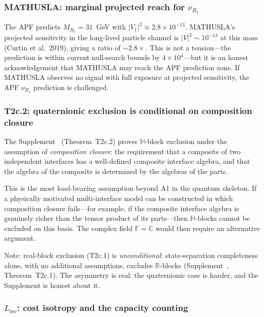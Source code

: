 \documentclass[11pt]{article}
\begin{document}
\subsubsection{MATHUSLA: marginal projected reach for \texorpdfstring{$\nu_{R_1}$}{nu\_R1}}

The APF predicts $M_{R_1} = 31$~GeV with $|V_1|^2 \approx 2.8\times10^{-13}$.  MATHUSLA's projected sensitivity in the long-lived particle channel is $|V|^2 \sim 10^{-13}$ at this mass (Curtin et al.\ 2019), giving a ratio of $\sim 2.8\times$.  This is not a tension---the prediction is within current null-search bounds by $4\times10^4$---but it is an honest acknowledgement that MATHUSLA may reach the APF prediction zone.  If MATHUSLA observes no signal with full exposure at projected sensitivity, the APF $\nu_{R_1}$ prediction is challenged.


\subsubsection{T2c.2: quaternionic exclusion is conditional on composition closure}

The Supplement~\cite{Supp} (Theorem~T2c.2) proves $\mathbb{H}$-block exclusion under the assumption of \emph{composition closure}: the requirement that a composite of two independent interfaces has a well-defined composite interface algebra, and that the algebra of the composite is determined by the algebras of the parts.

This is the most load-bearing assumption beyond A1 in the quantum skeleton.  If a physically motivated multi-interface model can be constructed in which composition closure fails---for example, if the composite interface algebra is genuinely richer than the tensor product of its parts---then $\mathbb{H}$-blocks cannot be excluded on this basis.  The complex field $\mathbb{F} = \mathbb{C}$ would then require an alternative argument.

Note: real-block exclusion (T2c.1) is \emph{unconditional}: state-separation completeness alone, with no additional assumptions, excludes $\mathbb{R}$-blocks (Supplement~\cite{Supp}, Theorem~T2c.1).  The asymmetry is real: the quaternionic case is harder, and the Supplement is honest about it.

\subsubsection{\texorpdfstring{$L_{\mathrm{iso}}$}{Liso}: cost isotropy and the capacity counting}
\end{document}
